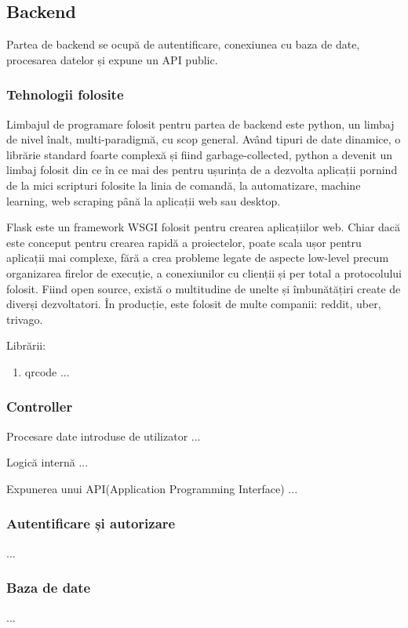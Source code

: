 \documentclass{article}
\begin{document}
    \subsection{Backend}
    \label{Backend}
    Partea de backend se ocupă de autentificare, conexiunea cu baza de date, procesarea datelor și expune un API public.
    \subsubsection{Tehnologii folosite}
    \label{Backend-tehnologii}
    Limbajul de programare folosit pentru partea de backend este python, un limbaj de nivel înalt, multi-paradigmă, cu scop general. Având tipuri de date dinamice, o librărie standard foarte complexă și fiind garbage-collected, python a devenit un limbaj folosit din ce în ce mai des pentru ușurința de a dezvolta aplicații pornind de la mici scripturi folosite la linia de comandă, la automatizare, machine learning, web scraping până la aplicații web sau desktop. 

    Flask este un framework WSGI folosit pentru crearea aplicațiilor web. Chiar dacă este conceput pentru crearea rapidă a proiectelor, poate scala ușor pentru aplicații mai complexe, fără a crea probleme legate de aspecte low-level precum organizarea firelor de execuție, a conexiunilor cu clienții și per total a protocolului folosit. Fiind open source, există o multitudine de unelte și îmbunătățiri create de diverși dezvoltatori. În producție, este folosit de multe companii: reddit, uber, trivago.

    Librării:
    \begin{enumerate}[noitemsep]
        \item qrcode ...
    \end{enumerate}

    \subsubsection{Controller}
    \label{Controller}
    Procesare date introduse de utilizator ...

    Logică internă ...

    Expunerea unui API(Application Programming Interface) ...
    \subsubsection{Autentificare și autorizare}
    \label{Autentificare}
    ...
    \subsubsection{Baza de date}
    \label{Baza de date}
    ...
\end{document}
